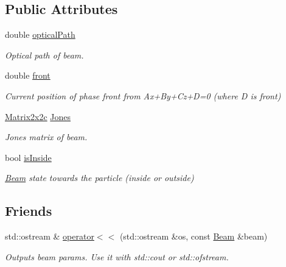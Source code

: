 \subsection*{Public Attributes}
\begin{DoxyCompactItemize}
\item 
\mbox{\label{class_beam_a9b914eb95bb720ef405edfb80bda3c41}} 
double \mbox{\hyperlink{class_beam_a9b914eb95bb720ef405edfb80bda3c41}{optical\+Path}}
\begin{DoxyCompactList}\small\item\em Optical path of beam. \end{DoxyCompactList}\item 
\mbox{\label{class_beam_a2640aeff4f9d38ff8c6da5cabda0b070}} 
double \mbox{\hyperlink{class_beam_a2640aeff4f9d38ff8c6da5cabda0b070}{front}}
\begin{DoxyCompactList}\small\item\em Current position of phase front from Ax+\+By+\+Cz+D=0 (where D is front) \end{DoxyCompactList}\item 
\mbox{\label{class_beam_a86c9a07440dc286729261c86bd83e05b}} 
\mbox{\hyperlink{class_matrix2x2c}{Matrix2x2c}} \mbox{\hyperlink{class_beam_a86c9a07440dc286729261c86bd83e05b}{Jones}}
\begin{DoxyCompactList}\small\item\em Jones matrix of beam. \end{DoxyCompactList}\item 
\mbox{\label{class_beam_a823d6dda3dc96dd2382e41647bda0268}} 
bool \mbox{\hyperlink{class_beam_a823d6dda3dc96dd2382e41647bda0268}{is\+Inside}}
\begin{DoxyCompactList}\small\item\em \mbox{\hyperlink{class_beam}{Beam}} state towards the particle (inside or outside) \end{DoxyCompactList}\end{DoxyCompactItemize}
\subsection*{Friends}
\begin{DoxyCompactItemize}
\item 
std\+::ostream \& \mbox{\hyperlink{class_beam_a9329c5f95148c6d5fc95d72ab66d8265}{operator$<$$<$}} (std\+::ostream \&os, const \mbox{\hyperlink{class_beam}{Beam}} \&beam)
\begin{DoxyCompactList}\small\item\em Outputs beam params. Use it with std\+::cout or std\+::ofstream. \end{DoxyCompactList}\end{DoxyCompactItemize}


